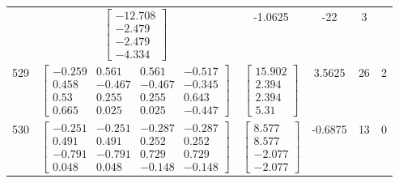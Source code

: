 \documentclass[a4paper,12pt]{article}
\begin{document}
\begin{tabular}{c c c c c c}
&
$\begin{bmatrix} -12.708 \\ -2.479 \\ -2.479 \\ -4.334 \end{bmatrix}$
&
-1.0625
&
-22
&
3
\\
529
&
$\begin{bmatrix} -0.259 & 0.561 & 0.561 & -0.517 \\ 0.458 & -0.467 & -0.467 & -0.345 \\ 0.53 & 0.255 & 0.255 & 0.643 \\ 0.665 & 0.025 & 0.025 & -0.447 \end{bmatrix}$
&
$\begin{bmatrix} 15.902 \\ 2.394 \\ 2.394 \\ 5.31 \end{bmatrix}$
&
3.5625
&
26
&
2
\\
530
&
$\begin{bmatrix} -0.251 & -0.251 & -0.287 & -0.287 \\ 0.491 & 0.491 & 0.252 & 0.252 \\ -0.791 & -0.791 & 0.729 & 0.729 \\ 0.048 & 0.048 & -0.148 & -0.148 \end{bmatrix}$
&
$\begin{bmatrix} 8.577 \\ 8.577 \\ -2.077 \\ -2.077 \end{bmatrix}$
&
-0.6875
&
13
&
0
\\
\end{tabular} \egroup \newpage
\end{document}
